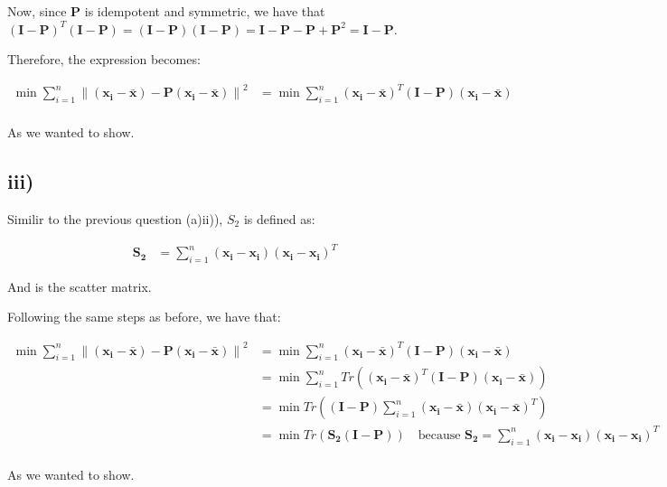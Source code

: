 \documentclass[12pt,a4paper,oneside]{paper}
\begin{document}
Now, since $\bm{P}$ is idempotent and symmetric, we have that $(\bm{I} - \bm{P})^T (\bm{I} - \bm{P}) = (\bm{I} - \bm{P}) (\bm{I} - \bm{P}) = \bm{I} - \bm{P} - \bm{P} + \bm{P}^2 = \bm{I} - \bm{P}$.

Therefore, the expression becomes:

\begin{align*}
    \min \sum_{i=1}^{n} \left\| \left( \bm{x_i} - \bm{\bar{x}} \right) - \bm{P} \left( \bm{x_i} - \bm{\bar{x}} \right) \right\|^2 &= \min \sum_{i=1}^{n} \left( \bm{x_i} - \bm{\bar{x}} \right)^T (\bm{I} - \bm{P}) \left( \bm{x_i} - \bm{\bar{x}} \right) \\
\end{align*}

As we wanted to show.

\subsection*{iii)}

Similir to the previous question (a)ii)), $S_2$ is defined as:

\begin{align*}
    \bm{S_2} &= \sum_{i=1}^{n} \left( \bm{x_i} - \bm{x_i} \right) \left( \bm{x_i} - \bm{x_i} \right)^T
\end{align*}

And is the scatter matrix.

Following the same steps as before, we have that:

\begin{align*}
    \min \sum_{i=1}^{n} \left\| \left( \bm{x_i} - \bm{\bar{x}} \right) - \bm{P} \left( \bm{x_i} - \bm{\bar{x}} \right) \right\|^2 &= \min \sum_{i=1}^{n} \left( \bm{x_i} - \bm{\bar{x}} \right)^T (\bm{I} - \bm{P}) \left( \bm{x_i} - \bm{\bar{x}} \right) \\
    &= \min \sum_{i=1}^{n} Tr \left( \left( \bm{x_i} - \bm{\bar{x}} \right)^T (\bm{I} - \bm{P}) \left( \bm{x_i} - \bm{\bar{x}} \right) \right) \\
    &= \min Tr \left( (\bm{I} - \bm{P}) \sum_{i=1}^{n} \left( \bm{x_i} - \bm{\bar{x}} \right) \left( \bm{x_i} - \bm{\bar{x}} \right)^T \right) \\
    &= \min Tr \left( \bm{S_2} (\bm{I} - \bm{P}) \right) \quad {\text{because $\bm{S_2} = \sum_{i=1}^{n} \left( \bm{x_i} - \bm{x_i} \right) \left( \bm{x_i} - \bm{x_i} \right)^T$}} \\
\end{align*}

As we wanted to show.
\end{document}
